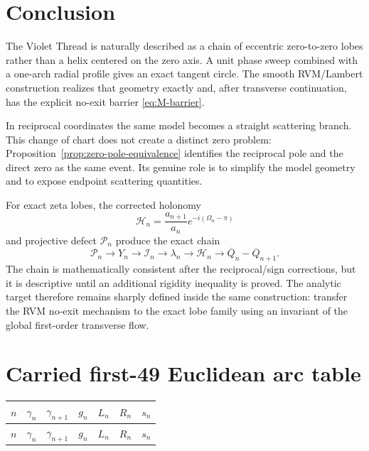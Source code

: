 \documentclass[11pt]{amsart}
\numberwithin{equation}{section}
\theoremstyle{definition}
\theoremstyle{remark}
\newcommand{\Ical}{\mathcal I}
\newcommand{\Hcal}{\mathcal H}
\newcommand{\Pcal}{\mathcal P}
\begin{document}
\section{Conclusion}
\label{sec:conclusion}

The Violet Thread is naturally described as a chain of eccentric zero-to-zero lobes rather than a helix centered on the zero axis.  A unit phase sweep combined with a one-arch radial profile gives an exact tangent circle.  The smooth RVM/Lambert construction realizes that geometry exactly and, after transverse continuation, has the explicit no-exit barrier \eqref{eq:M-barrier}.

In reciprocal coordinates the same model becomes a straight scattering branch.  This change of chart does not create a distinct zero problem: Proposition~\ref{prop:zero-pole-equivalence} identifies the reciprocal pole and the direct zero as the same event.  Its genuine role is to simplify the model geometry and to expose endpoint scattering quantities.

For exact zeta lobes, the corrected holonomy
\begin{equation}
\Hcal_n=\frac{a_{n+1}}{a_n}e^{-i(\Omega_n-\pi)}
\label{eq:conclusion-holonomy}
\end{equation}
and projective defect $\Pcal_n$ produce the exact chain
\begin{equation}
\Pcal_n
\longrightarrow
Y_n
\longrightarrow
\Ical_n
\longrightarrow
\lambda_n
\longrightarrow
\Hcal_n
\longrightarrow
\overline Q_n-\overline Q_{n+1}.
\label{eq:conclusion-chain}
\end{equation}
The chain is mathematically consistent after the reciprocal/sign corrections, but it is descriptive until an additional rigidity inequality is proved.  The analytic target therefore remains sharply defined inside the same construction: transfer the RVM no-exit mechanism to the exact lobe family using an invariant of the global first-order transverse flow.

\appendix

\section{Carried first-49 Euclidean arc table}
\label{sec:appendix-arc-table}

\small
\begin{longtable}{rrrrrrr}
\toprule
$n$ & $\gamma_n$ & $\gamma_{n+1}$ & $g_n$ & $L_n$ & $R_n$ & $s_n$\\
\midrule
\endfirsthead
\toprule
$n$ & $\gamma_n$ & $\gamma_{n+1}$ & $g_n$ & $L_n$ & $R_n$ & $s_n$\\
\midrule
\endhead

\end{longtable}
\normalsize
\end{document}
